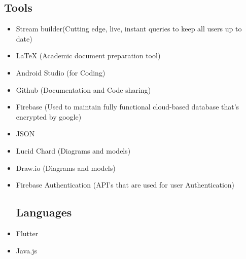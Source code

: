 \documentclass[12pt]{article}
\begin{document}
\subsection{Tools}
\begin{itemize}
\item Stream builder(Cutting edge, live, instant queries to keep all users up to date)
  \item  LaTeX (Academic document preparation tool) 
  \item  Android Studio (for Coding)
  \item  Github (Documentation and Code sharing)
  \item  Firebase (Used to maintain fully functional cloud-based database that's encrypted by google)
  \item  JSON
  \item  Lucid Chard (Diagrams and models)
  \item  Draw.io (Diagrams and models)
  \item  Firebase Authentication (API's that are used for user Authentication) 
\subsection{Languages}
\item Flutter
\item Java.js
\end{itemize}
\clearpage
\end{document}
